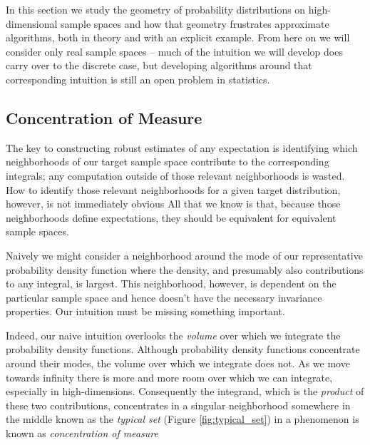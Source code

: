 \documentclass[11pt, oneside]{article}
\begin{document}
In this section we study the geometry of probability distributions
on high-dimensional sample spaces and how that geometry frustrates
approximate algorithms, both in theory and with an explicit example.  
From here on we will consider only real sample spaces -- much of the 
intuition we will develop does carry over to the discrete case, but 
developing algorithms around that corresponding intuition is still an 
open problem in statistics.

\subsection{Concentration of Measure}

The key to constructing robust estimates of any expectation is identifying 
which neighborhoods of our target sample space contribute to the 
corresponding integrals; any computation outside of those relevant 
neighborhoods is wasted.  How to identify those relevant neighborhoods 
for a given target distribution, however, is not immediately obvious
All that we know is that, because those neighborhoods define expectations,
they should be equivalent for equivalent sample spaces.

Naively we might consider a neighborhood around the mode of our 
representative probability density function where the density, and 
presumably also contributions to any integral, is largest.  This
neighborhood, however, is dependent on the particular sample
space and hence doesn't have the necessary invariance properties.
Our intuition must be missing something important.

Indeed, our naive intuition overlooks the \emph{volume} over which 
we integrate the probability density functions.  Although probability 
density functions concentrate around their modes, the volume over which
we integrate does not.  As we move towards infinity there is more and
more room over which we can integrate, especially in high-dimensions.
Consequently the integrand, which is the \emph{product} of these two 
contributions, concentrates in a singular neighborhood somewhere in the 
middle known as the \emph{typical set} (Figure \ref{fig:typical_set}) in
a phenomenon is known as \emph{concentration of measure}
\end{document}
